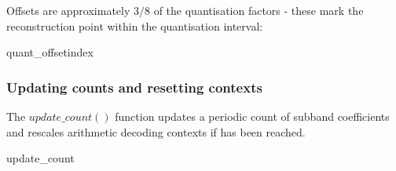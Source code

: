 Offsets are approximately $3/8$ of the quantisation factors - these
mark the reconstruction point within the quantisation interval:

\begin{pseudo}{quant\_offset}{index}
\end{pseudo}

\subsubsection{Updating counts and resetting contexts}
\label{updatecounts}

The $update\_count()$ function updates a periodic count of subband 
coefficients and rescales arithmetic decoding contexts if \CoefficientReset has been reached.

\begin{pseudo}{update\_count}{}
\bsIF{\CoefficientCount == \CoefficientReset}
  \bsEND
\bsEND
\end{pseudo}

